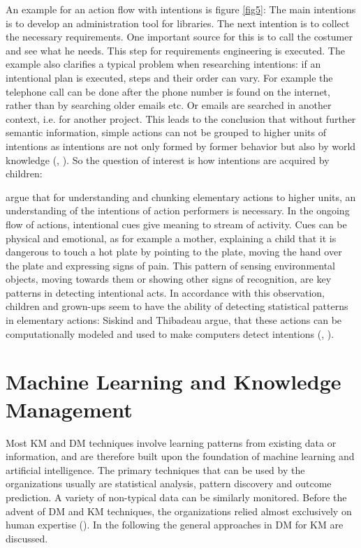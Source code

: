 An example for an action flow with intentions is figure \ref{fig5}: The main intentions is to develop an administration tool for libraries. The next intention is to collect the necessary requirements. One important source for this is to call the costumer and see what he needs. This step for requirements engineering is executed. The example also clarifies a typical problem when researching intentions: if an intentional plan is executed, steps and their order can vary. For example the telephone call can be done after the phone number is found on the internet, rather than by searching older emails etc. Or emails are searched in another context, i.e. for another project. This leads to the conclusion that without further semantic information, simple actions can not be grouped to higher units of intentions as intentions are not only formed by former behavior but also by world knowledge (\cite{baldwin2001discerning}, \cite{bandura1977social}). So the question of interest is how intentions are acquired by children:

\cite{baldwin2001discerning} argue that for understanding and chunking elementary actions to higher units, an understanding of the intentions of action performers is necessary. In the ongoing flow of actions, intentional cues give meaning to stream of activity. Cues can be physical and emotional, as for example a mother, explaining a child that it is dangerous to touch a hot plate by pointing to the plate, moving the hand over the plate and expressing signs of pain. This pattern of sensing environmental objects, moving towards them or showing other signs of recognition, are key patterns in detecting intentional acts. 
In accordance with this observation, children and grown-ups seem to have the ability of detecting statistical patterns in elementary actions: Siskind and Thibadeau argue, that these actions can be computationally modeled and used to make computers detect intentions (\cite{thibadeau1986artificial}, \cite{siskind1995grounding}). 

\section{Machine Learning and Knowledge Management}
Most KM and \ac{DM} techniques involve learning patterns from existing data or information, and are therefore built upon the foundation of machine learning and artificial intelligence. The primary techniques that can be used by the organizations usually are statistical analysis, pattern discovery and outcome prediction. A variety of non-typical data can be similarly monitored. Before the advent of \acs{DM} and \acs{KM} techniques, the organizations relied almost exclusively on human expertise (\cite{tsai2012knowledge}). In the following the general approaches in \acs{DM} for \acs{KM} are discussed.


